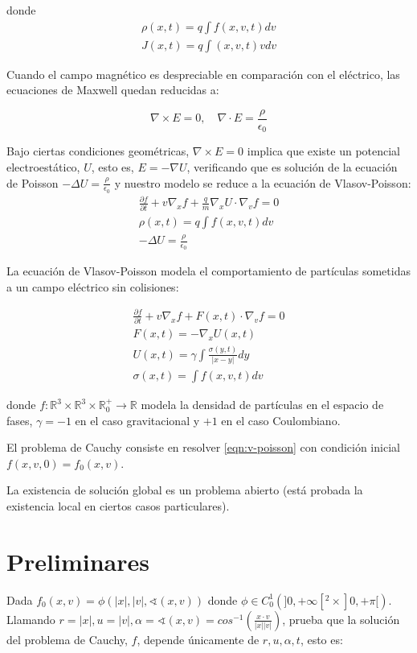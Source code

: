 \documentclass[a4paper,10pt]{scrartcl}
\theoremstyle{definition}
\numberwithin{equation}{section}
\begin{document}
donde 
\begin{align*}
\rho(x,t) = q \int f(x,v,t) dv\\
J(x,t) = q \int (x,v,t) v dv
\end{align*}

Cuando el campo magnético es despreciable en comparación con el eléctrico, las ecuaciones de Maxwell quedan reducidas a:

\begin{equation*}
 \nabla \times E = 0, \quad \nabla \cdot E = \frac{\rho}{\epsilon_0}
\end{equation*}

Bajo ciertas condiciones geométricas, $\nabla \times E = 0$ implica que existe un potencial electroestático, $U$, esto es, $E = - \nabla U$, verificando que es solución de la ecuación de Poisson $-\Delta U = \frac{\rho}{\epsilon_0}$ y nuestro modelo se reduce a la ecuación de Vlasov-Poisson:
\begin{align}
 \frac{\partial f}{\partial t} + v \nabla_x f + \frac{q}{m}\nabla_x U \cdot \nabla_v f = 0\\
 \rho(x,t) = q \int f(x,v,t) dv \nonumber\\
 -\Delta U = \frac{\rho}{\epsilon_0} \nonumber
\end{align}


La ecuación de Vlasov-Poisson modela el comportamiento de partículas sometidas a un campo eléctrico sin colisiones:

\begin{align}
\label{eqn:v-poisson}
 \frac{\partial f}{\partial t} + v \nabla_x f + F(x,t) \cdot \nabla_v f = 0\\
 F(x,t) = - \nabla_x U(x,t) \nonumber \\ 
 U(x,t) = \gamma \int \frac{\sigma(y,t)}{|x-y|} dy \nonumber \\
 \sigma(x,t) = \int f(x,v,t) dv \nonumber
\end{align}

donde $f:\mathbb{R}^3 \times \mathbb{R}^3 \times \mathbb{R}^{+}_0 \rightarrow \mathbb{R}$ modela la densidad de partículas en el espacio de fases, $\gamma = -1$ en el caso gravitacional y $+1$ en el caso Coulombiano.

El problema de Cauchy consiste en resolver \eqref{eqn:v-poisson} con condición inicial $f(x,v,0) = f_0(x,v)$.

La existencia de solución global es un problema abierto (está probada la existencia local en ciertos casos particulares).

\section{Preliminares}
Dada $f_0(x,v) = \phi(|x|, |v|, \sphericalangle(x,v))$ donde $\phi \in C_0^1(]0,+\infty[^2 \times ]0,+\pi[)$. Llamando $r = |x|, u = |v|, \alpha = \sphericalangle(x,v) = cos^{-1}\left(\frac{x\cdot v}{|x||v|}\right)$, \cite{Batt} prueba que la solución del problema de Cauchy, $f$, depende únicamente de $r, u, \alpha, t$, esto es:
\end{document}
